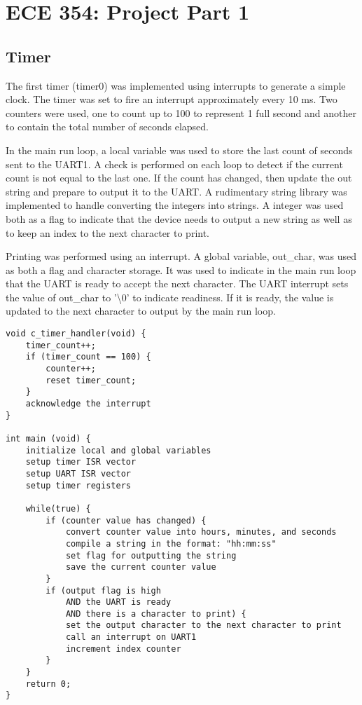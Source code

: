 \documentclass[oneside]{article}
\begin{document}
\lstset{language=C}
\section*{ECE 354: Project Part 1}
\subsection*{Timer}
The first timer (timer0) was implemented using interrupts to generate a simple
clock. The timer was set to fire an interrupt approximately every 10 ms. Two
counters were used, one to count up to 100 to represent 1 full second and
another to contain the total number of seconds elapsed.

In the main run loop, a local variable was used to store the last count of
seconds sent to the UART1. A check is performed on each loop to detect if the
current count is not equal to the last one. If the count has changed, then
update the out string and prepare to output it to the UART. A rudimentary
string library was implemented to handle converting the integers into strings.
A integer was used both as a flag to indicate that the device needs
to output a new string as well as to keep an index to the next character to
print. 

Printing was performed using an interrupt. A global variable, out\_char, was
used as both a flag and character storage. It was used to indicate in the main
run loop that the UART is ready to accept the next character. The UART
interrupt sets the value of out\_char to '\textbackslash{}0' to indicate 
readiness. If it is ready, the value is updated to the next character to output
by the main run loop.

\begin{lstlisting} 
void c_timer_handler(void) {
    timer_count++;
    if (timer_count == 100) {
        counter++;
        reset timer_count;
    }
    acknowledge the interrupt
}

int main (void) {
    initialize local and global variables
    setup timer ISR vector
    setup UART ISR vector
    setup timer registers

    while(true) {
        if (counter value has changed) {
            convert counter value into hours, minutes, and seconds
            compile a string in the format: "hh:mm:ss"
            set flag for outputting the string
            save the current counter value
        }
        if (output flag is high 
            AND the UART is ready 
            AND there is a character to print) {
            set the output character to the next character to print
            call an interrupt on UART1
            increment index counter
        }
    }
    return 0;
}
\end{lstlisting}
\end{document}
